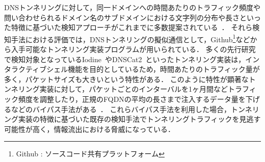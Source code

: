 DNSトンネリングに対して，同一ドメインへの時間あたりのトラフィック頻度や問い合わせられるドメイン名のサブドメインにおける文字列の分布や長さといった特徴に基づいた検知アプローチがこれまでに多数提案されている~\cite{born, cheng, liu, asaf, steadman, jawad}．
それら検知手法における評価では，DNSトンネリングの擬似通信として，Github\footnote{Github : ソースコード共有プラットフォーム}などから入手可能なトンネリング実装プログラムが用いられている．
多くの先行研究で検知対象となっているIodine~\cite{iodine}やDNSCat2~\cite{dnscat2}といったトンネリング実装は，インタラクティブシェル機能を目的としているため，時間あたりのトラフィック量が多く，パケットサイズも大きいという特性がある．
このように特性が顕著なトンネリング実装に対して，パケットごとのインターバルを1ヶ月間などトラフィック頻度を調整したり，正規のFQDNの平均の長さまで注入するデータ量を下げるなどのバイパス手法がある~\cite{asaf}．
これらバイパス手法を利用した場合，トンネリング実装の特徴に基づいた既存の検知手法でトンネリングトラフィックを見逃す可能性が高く，情報流出における脅威になっている．

